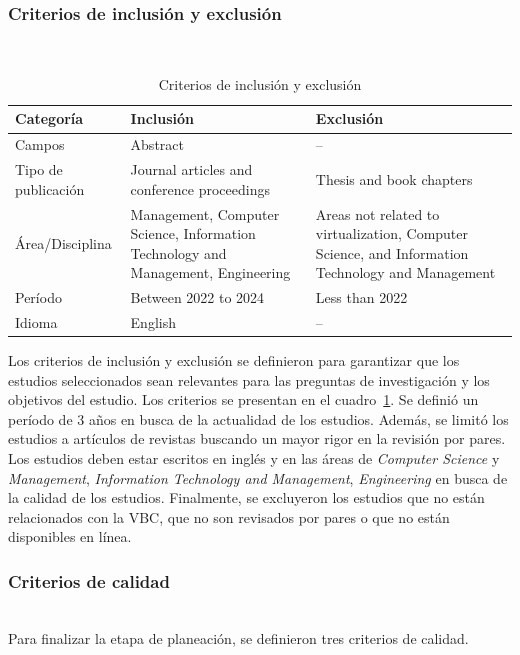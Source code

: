 \subsubsection{Criterios de inclusión y exclusión}
\mbox{}\\
\begin{table}[!t]
\centering
\renewcommand{\arraystretch}{1.4}
\begin{tabularx}{\textwidth}{>{\centering\arraybackslash}m{} >{\RaggedRight\arraybackslash}X >{\RaggedRight\arraybackslash}X}
\toprule
\textbf{Categoría} & \textbf{Inclusión} & \textbf{Exclusión} \\
\midrule
Campos & Abstract & -- \\
\midrule
Tipo de publicación & Journal articles and conference proceedings & Thesis and book chapters \\
\midrule
Área/Disciplina & Management, Computer Science, Information Technology and Management, Engineering & Areas not related to virtualization, Computer Science, and Information Technology and Management \\
\midrule
Período & Between 2022 to 2024 & Less than 2022 \\
\midrule
Idioma & English & -- \\
\bottomrule
\end{tabularx}
\caption{Criterios de inclusión y exclusión}\label{tab:criterios}
\end{table}

Los criterios de inclusión y exclusión se definieron para garantizar que los estudios seleccionados sean relevantes para las preguntas de investigación y los objetivos del estudio. Los criterios se presentan en el cuadro~\ref{tab:criterios}.
Se definió un período de 3 años en busca de la actualidad de los estudios. Además, se limitó los estudios a artículos de revistas buscando un mayor rigor en la revisión por pares. Los estudios deben estar escritos en inglés y en las áreas de \textit{Computer Science} y \textit{Management}, \textit{Information Technology and Management}, \textit{Engineering} en busca de la calidad de los estudios. Finalmente, se excluyeron los estudios que no están relacionados con la VBC, que no son revisados por pares o que no están disponibles en línea.\\

\subsubsection{Criterios de calidad}
\mbox{}\\
Para finalizar la etapa de planeación, se definieron tres criterios de calidad. \\

